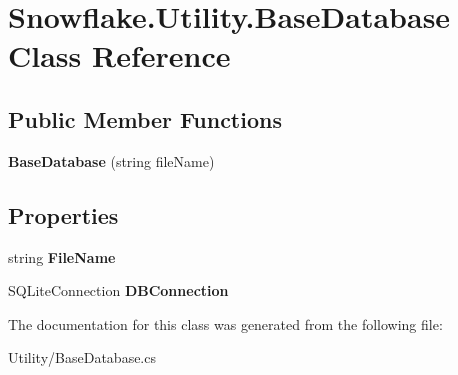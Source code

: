 \hypertarget{class_snowflake_1_1_utility_1_1_base_database}{}\section{Snowflake.\+Utility.\+Base\+Database Class Reference}
\label{class_snowflake_1_1_utility_1_1_base_database}
\subsection*{Public Member Functions}
\begin{DoxyCompactItemize}
\item 
\hypertarget{class_snowflake_1_1_utility_1_1_base_database_a9e4af6c69c3ccfdd1b96e5b57647af17}{}{\bfseries Base\+Database} (string file\+Name)\label{class_snowflake_1_1_utility_1_1_base_database_a9e4af6c69c3ccfdd1b96e5b57647af17}

\end{DoxyCompactItemize}
\subsection*{Properties}
\begin{DoxyCompactItemize}
\item 
\hypertarget{class_snowflake_1_1_utility_1_1_base_database_a7f9dd647373f1683b2f43d5ecc64a851}{}string {\bfseries File\+Name}\label{class_snowflake_1_1_utility_1_1_base_database_a7f9dd647373f1683b2f43d5ecc64a851}

\item 
\hypertarget{class_snowflake_1_1_utility_1_1_base_database_a05b751ea17d1799614ca78b46166e30a}{}S\+Q\+Lite\+Connection {\bfseries D\+B\+Connection}\label{class_snowflake_1_1_utility_1_1_base_database_a05b751ea17d1799614ca78b46166e30a}

\end{DoxyCompactItemize}


The documentation for this class was generated from the following file\+:\begin{DoxyCompactItemize}
\item 
Utility/Base\+Database.\+cs\end{DoxyCompactItemize}
